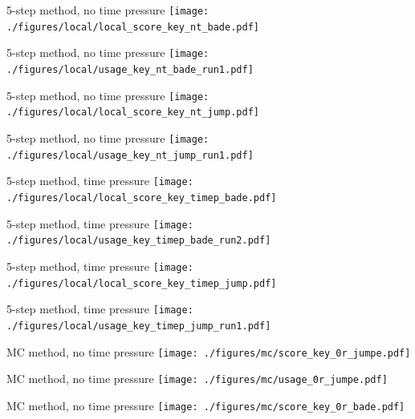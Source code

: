 \documentclass[hyperref={pdfpagelabels=false}]{beamer}
\begin{document}
\begin{frame}{5-step method, no time pressure}
\texttt{[image: ./figures/local/local\_score\_key\_nt\_bade.pdf]}
\end{frame}

\begin{frame}{5-step method, no time pressure}
\texttt{[image: ./figures/local/usage\_key\_nt\_bade\_run1.pdf]}
\end{frame}

\begin{frame}{5-step method, no time pressure}
\texttt{[image: ./figures/local/local\_score\_key\_nt\_jump.pdf]}
\end{frame}

\begin{frame}{5-step method, no time pressure}
\texttt{[image: ./figures/local/usage\_key\_nt\_jump\_run1.pdf]}
\end{frame}

\begin{frame}{5-step method, time pressure}
\texttt{[image: ./figures/local/local\_score\_key\_timep\_bade.pdf]}
\end{frame}

\begin{frame}{5-step method, time pressure}
\texttt{[image: ./figures/local/usage\_key\_timep\_bade\_run2.pdf]}
\end{frame}

\begin{frame}{5-step method, time pressure}
\texttt{[image: ./figures/local/local\_score\_key\_timep\_jump.pdf]}
\end{frame}

\begin{frame}{5-step method, time pressure}
\texttt{[image: ./figures/local/usage\_key\_timep\_jump\_run1.pdf]}
\end{frame}

\begin{frame}{MC method, no time pressure}
\texttt{[image: ./figures/mc/score\_key\_0r\_jumpe.pdf]}
\end{frame}

\begin{frame}{MC method, no time pressure}
\texttt{[image: ./figures/mc/usage\_0r\_jumpe.pdf]}
\end{frame}

\begin{frame}{MC method, no time pressure}
\texttt{[image: ./figures/mc/score\_key\_0r\_bade.pdf]}
\end{frame}
\end{document}
